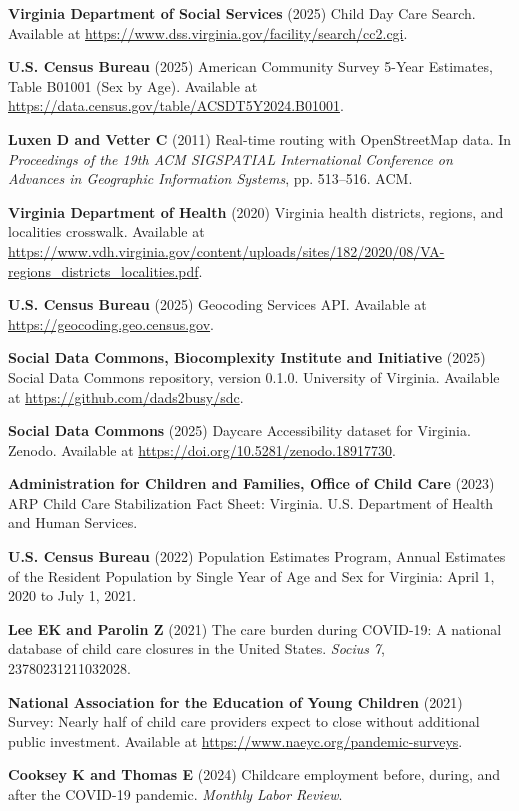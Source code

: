\documentclass{CUP-JNL-DAP}%
\begin{document}
\begin{Backmatter}
\begin{thebibliography}{}
\textbf{Virginia Department of Social Services} (2025) Child Day Care Search. Available at \url{https://www.dss.virginia.gov/facility/search/cc2.cgi}.

\textbf{U.S. Census Bureau} (2025) American Community Survey 5-Year Estimates, Table B01001 (Sex by Age). Available at \url{https://data.census.gov/table/ACSDT5Y2024.B01001}.

\textbf{Luxen D and Vetter C} (2011) Real-time routing with OpenStreetMap data. In \textit{Proceedings of the 19th ACM SIGSPATIAL International Conference on Advances in Geographic Information Systems}, pp. 513--516. ACM.

\textbf{Virginia Department of Health} (2020) Virginia health districts, regions, and localities crosswalk. Available at \url{https://www.vdh.virginia.gov/content/uploads/sites/182/2020/08/VA-regions_districts_localities.pdf}.

\textbf{U.S. Census Bureau} (2025) Geocoding Services API. Available at \url{https://geocoding.geo.census.gov}.

\textbf{Social Data Commons, Biocomplexity Institute and Initiative} (2025) Social Data Commons repository, version 0.1.0. University of Virginia. Available at \url{https://github.com/dads2busy/sdc}.

\textbf{Social Data Commons} (2025) Daycare Accessibility dataset for Virginia. Zenodo. Available at \url{https://doi.org/10.5281/zenodo.18917730}.

\textbf{Administration for Children and Families, Office of Child Care} (2023) ARP Child Care Stabilization Fact Sheet: Virginia. U.S. Department of Health and Human Services.

\textbf{U.S. Census Bureau} (2022) Population Estimates Program, Annual Estimates of the Resident Population by Single Year of Age and Sex for Virginia: April 1, 2020 to July 1, 2021.

\textbf{Lee EK and Parolin Z} (2021) The care burden during COVID-19: A national database of child care closures in the United States. \textit{Socius} \textit{7}, 23780231211032028.

\textbf{National Association for the Education of Young Children} (2021) Survey: Nearly half of child care providers expect to close without additional public investment. Available at \url{https://www.naeyc.org/pandemic-surveys}.

\textbf{Cooksey K and Thomas E} (2024) Childcare employment before, during, and after the COVID-19 pandemic. \textit{Monthly Labor Review}.

\end{thebibliography}

\end{Backmatter}
\end{document}
